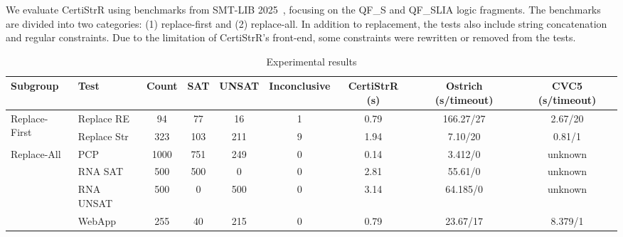We evaluate {CertiStrR} using benchmarks from SMT-LIB 2025~\cite{smtlib_benchmarks}, focusing on the \textsf{QF\_S} and \textsf{QF\_SLIA} logic fragments. The benchmarks are divided into two categories: (1) replace-first and (2) replace-all. In addition to replacement, the tests also include string concatenation and regular constraints. Due to the limitation of CertiStrR's front-end, some constraints were rewritten or removed from the tests.






\begin{table}[h]
\centering
\small
\setlength{\tabcolsep}{4pt}
\renewcommand{\arraystretch}{1.1}
\begin{tabular}{llccccccc}
  \toprule
  \textbf{Subgroup} & \textbf{Test} & \textbf{Count} & \textbf{SAT} & \textbf{UNSAT} & \textbf{Inconclusive} & \textbf{CertiStrR (s)} & \textbf{Ostrich (s/timeout)} & \textbf{CVC5 (s/timeout)} \\
  \midrule
  \multirow{2}{*}{Replace-First} & Replace RE  & 94  & 77  & 16  & 1 & 0.79 & 166.27/27 & 2.67/20 \\
   & Replace Str & 323 & 103 & 211 & 9 & 1.94 & 7.10/20 & 0.81/1 \\
     \midrule
  \multirow{4}{*}{Replace-All} & PCP & 1000 & 751 & 249 & 0 & 0.14 & 3.412/0 & unknown \\
   & RNA SAT   & 500  & 500 & 0   & 0 & 2.81 & 55.61/0 & unknown \\
   & RNA UNSAT & 500  & 0   & 500 & 0 & 3.14 & 64.185/0 & unknown \\
   & WebApp      & 255  & 40  & 215 & 0 & 0.79 & 23.67/17 & 8.379/1 \\
  \bottomrule
\end{tabular}
\caption{Experimental results}
\label{tab:string_operations}
\end{table}


